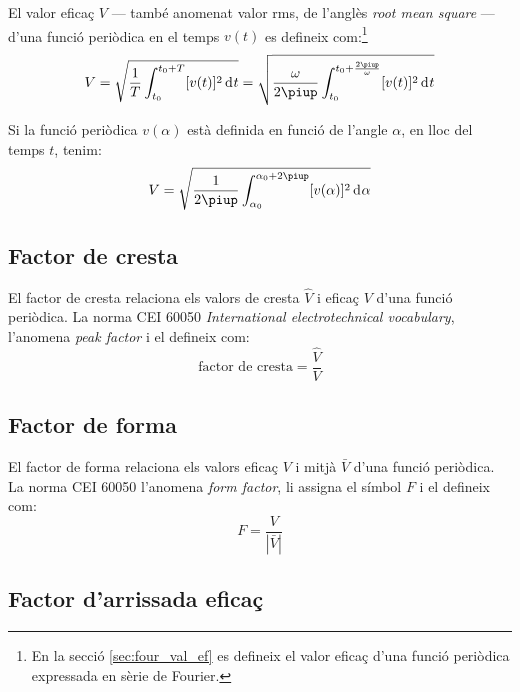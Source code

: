 El valor eficaç  $V$ --- també anomenat valor rms, de l'anglès \textit{root mean square} --- d'una funció periòdica en el temps $v(t)$ es defineix com:\footnote{En la secció \ref{sec:four_val_ef} es defineix el valor eficaç d'una funció periòdica expressada en sèrie de Fourier.}
\begin{equation}
    V = \sqrt{\frac{1}{T} \int_{t_0}^{t_0+T} [v(t)]^2 \diff
    t} = \sqrt{\frac{\omega}{2\piup} \int_{t_0}^{t_0+\frac{2\piup}{\omega}}
     [v(t)]^2 \diff t}
\end{equation}

Si la funció periòdica $v(\alpha)$ està definida en funció de
l'angle $\alpha$, en lloc del temps $t$, tenim:
\begin{equation}
    V = \sqrt{\frac{1}{2\piup} \int_{\alpha_0}^{\alpha_0+2\piup}
     [v(\alpha)]^2 \diff \alpha}
\end{equation}

\subsection{Factor de cresta}

El factor de cresta relaciona els valors de cresta $\hat{V}$
  i eficaç $V$ d'una funció periòdica. La norma CEI 60050 \textit{International electrotechnical vocabulary}, l'anomena \textit{peak factor} i el defineix com:
\begin{equation}
     \text{factor de cresta} = \frac{\hat{V}}{V}
\end{equation}

\subsection{Factor de forma}

El factor de forma relaciona els valors eficaç $V$
i mitjà $\bar{V}$ d'una funció periòdica. La norma CEI 60050 l'anomena \textit{form factor}, li assigna el símbol $F$ i el defineix com:
\begin{equation}
    F = \frac{V}{|\bar{V}|}
\end{equation}

\subsection{Factor d'arrissada eficaç}

